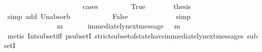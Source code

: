 \begin{isabellebody}
\ \ \isamarkupfalse%
\ {\isachardoublequoteopen}{\isasymsigma}{}\ {\isasymin}\ {\isasymSigma}{\isachardoublequoteclose}\ \ {\isachardoublequoteopen}{\isasymsigma}{}\ {\isasymin}\ {\isasymSigma}{\isachardoublequoteclose}\isanewline
\ \ \isamarkupfalse%
\ {\isachardoublequoteopen}{\isasymsigma}{}\ {\isasymunion}\ {\isasymsigma}{}\ {\isasymin}\ {\isasymSigma}{\isachardoublequoteclose}\isanewline
\ \ \isamarkupfalse%
\ {\isacharparenleft}cases\ {\isachardoublequoteopen}{\isasymsigma}{}\ {\isasymsubseteq}\ {\isasymsigma}{}{\isachardoublequoteclose}{\isacharparenright}\isanewline
\ \ \ \ \isamarkupfalse%
\ True\isanewline
\ \ \ \ \isamarkupfalse%
\ \isamarkupfalse%
\ {\isacharquery}thesis\isanewline
\ \ \ \ \ \ \isamarkupfalse%
\ {\isacharparenleft}simp\ add{\isacharcolon}\ Un{\isacharunderscore}absorb{}\ {\isacartoucheopen}{\isasymsigma}{}\ {\isasymin}\ {\isasymSigma}{\isacartoucheclose}{\isacharparenright}\isanewline
\ \ \isamarkupfalse%
\isanewline
\ \ \ \ \isamarkupfalse%
\ False\isanewline
\ \ \ \ \isamarkupfalse%
\ \isamarkupfalse%
\ {\isachardoublequoteopen}{\isasymnot}\ {\isasymsigma}{}\ {\isasymsubseteq}\ {\isasymsigma}{}{\isachardoublequoteclose}\ \isamarkupfalse%
\ simp\isanewline
\ \ \ \ \isamarkupfalse%
\ {\isachardoublequoteopen}{\isasymforall}\ {\isasymsigma}\ {\isasymin}\ {\isasymSigma}{\isachardot}\ {\isasymforall}\ {\isasymsigma}{\isacharprime}\ {\isasymin}\ {\isasymSigma}{\isachardot}\ {\isasymnot}\ {\isasymsigma}\ {\isasymsubseteq}\ {\isasymsigma}{\isacharprime}\ {\isasymlongrightarrow}\ {\isacharparenleft}{\isasymexists}\ m\ {\isasymin}\ {\isasymsigma}\ {\isacharminus}\ {\isacharparenleft}{\isasymsigma}\ {\isasyminter}\ {\isasymsigma}{\isacharprime}{\isacharparenright}{\isachardot}\ immediately{\isacharunderscore}next{\isacharunderscore}message{\isacharparenleft}{\isasymsigma}\ {\isasyminter}\ {\isasymsigma}{\isacharprime}{\isacharcomma}\ m{\isacharparenright}{\isacharparenright}{\isachardoublequoteclose}\isanewline
\ \ \ \ \ \ \isamarkupfalse%
\ {\isacharparenleft}metis\ Int{\isacharunderscore}subset{\isacharunderscore}iff\ psubsetI\ strict{\isacharunderscore}subset{\isacharunderscore}of{\isacharunderscore}state{\isacharunderscore}have{\isacharunderscore}immediately{\isacharunderscore}next{\isacharunderscore}messages\ subsetI{\isacharparenright}\ \ \isanewline

\end{isabellebody}
